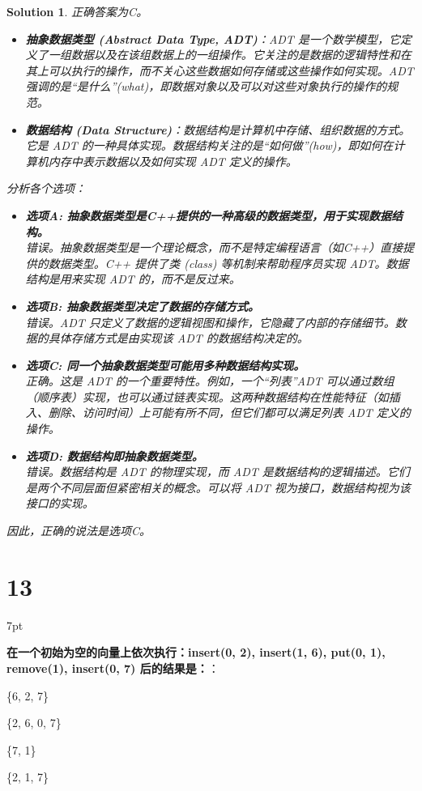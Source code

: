 \documentclass[UTF8]{report}
\newtheorem{solution}{Solution}
\theoremstyle{MyLineTheoremStyle} %
\theoremstyle{MyBlockTheoremStyle} %
\theoremstyle{MySubsubsectionStyle} %
\newenvironment{graybox}{%
        \def\FrameCommand{%
        \hspace{1pt}%
        {\color{gray}\small \vrule width 2pt}%
        {\color{graybox_color}\vrule width 4pt}%
        \colorbox{graybox_color}%
        }%
        \MakeFramed{\advance\hsize-\width\FrameRestore}%
        \noindent\hspace{-4.55pt}%
        \begin{adjustwidth}{}{7pt}%
        \vspace{2pt}\vspace{2pt}%
        }
        {%
        \vspace{2pt}\end{adjustwidth}\endMakeFramed%
        }
\begin{document}
\begin{solution}
正确答案为C。

\begin{itemize}
    \item \textbf{抽象数据类型 (Abstract Data Type, ADT)}：ADT 是一个数学模型，它定义了一组数据以及在该组数据上的一组操作。它关注的是数据的逻辑特性和在其上可以执行的操作，而不关心这些数据如何存储或这些操作如何实现。ADT 强调的是“是什么”(what)，即数据对象以及可以对这些对象执行的操作的规范。
    \item \textbf{数据结构 (Data Structure)}：数据结构是计算机中存储、组织数据的方式。它是 ADT 的一种具体实现。数据结构关注的是“如何做”(how)，即如何在计算机内存中表示数据以及如何实现 ADT 定义的操作。
\end{itemize}
分析各个选项：
\begin{itemize}
    \item \textbf{选项A: 抽象数据类型是C++提供的一种高级的数据类型，用于实现数据结构。} \\
    错误。抽象数据类型是一个理论概念，而不是特定编程语言（如C++）直接提供的数据类型。C++ 提供了类 (class) 等机制来帮助程序员实现 ADT。数据结构是用来实现 ADT 的，而不是反过来。
    \item \textbf{选项B: 抽象数据类型决定了数据的存储方式。} \\
    错误。ADT 只定义了数据的逻辑视图和操作，它隐藏了内部的存储细节。数据的具体存储方式是由实现该 ADT 的数据结构决定的。
    \item \textbf{选项C: 同一个抽象数据类型可能用多种数据结构实现。} \\
    正确。这是 ADT 的一个重要特性。例如，一个“列表”ADT 可以通过数组（顺序表）实现，也可以通过链表实现。这两种数据结构在性能特征（如插入、删除、访问时间）上可能有所不同，但它们都可以满足列表 ADT 定义的操作。
    \item \textbf{选项D: 数据结构即抽象数据类型。} \\
    错误。数据结构是 ADT 的物理实现，而 ADT 是数据结构的逻辑描述。它们是两个不同层面但紧密相关的概念。可以将 ADT 视为接口，数据结构视为该接口的实现。
\end{itemize}
因此，正确的说法是选项C。
\end{solution}

\section*{13}

\begin{graybox}
\textbf{在一个初始为空的向量上依次执行：insert(0, 2), insert(1, 6), put(0, 1), remove(1), insert(0, 7) 后的结果是：}：
\begin{circledenum}
    \item \{6, 2, 7\}
    \item \{2, 6, 0, 7\}
    \item \{7, 1\}
    \item \{2, 1, 7\}
\end{circledenum}
\end{graybox}
\end{document}
